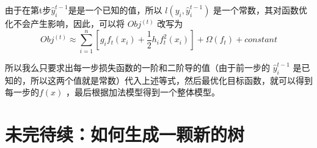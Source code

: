 \documentclass[12pt]{article}
\begin{document}
由于在第t步$\hat{y}_i^{t-1}$是是一个已知的值，所以 $l(y_i,\hat{y}_i^{t-1})$ 是一个常数，其对函数优化不会产生影响，因此，可以将 $Obj^{(t)}$ 改写为
$$
Obj^{(t)} \approx \sum_{i=1}^n[g_if_t(x_i) + \frac{1}{2}h_if_t^2(x_i)] + \Omega (f_t) + constant
$$

所以我么只要求出每一步损失函数的一阶和二阶导的值（由于前一步的 $\hat{y}_i^{t-1}$ 是已知的，所以这两个值就是常数）代入上述等式，然后最优化目标函数，就可以得到每一步的$f(x)$ ，最后根据加法模型得到一个整体模型。

\section{未完待续：如何生成一颗新的树}



\end{document}

